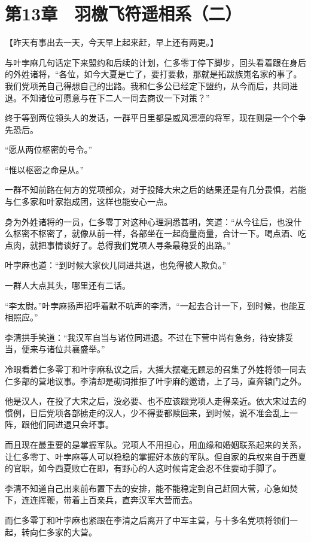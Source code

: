 \section{第13章　羽檄飞符遥相系（二）}

【昨天有事出去一天，今天早上起来赶，早上还有两更。】

与叶孛麻几句话定下来盟约和后续的计划，仁多零丁停下脚步，回头看着跟在身后的外姓诸将，“各位，如今大夏是亡了，要打要救，那就是拓跋族嵬名家的事了。我们党项羌自己得想自己的出路。我和仁多公已经定下盟约，从今而后，共同进退。不知诸位可愿意与在下二人一同去商议一下对策？”

终于等到两位领头人的发话，一群平日里都是威风凛凛的将军，现在则是一个个争先恐后。

“愿从两位枢密的号令。”

“惟以枢密之命是从。”

一群不知前路在何方的党项部众，对于投降大宋之后的结果还是有几分畏惧，若能与仁多家和叶家抱成团，这样也能安心一点。

身为外姓诸将的一员，仁多零丁对这种心理洞悉甚明，笑道：“从今往后，也没什么枢密不枢密了，就像从前一样，各部坐在一起商量商量，合计一下。喝点酒、吃点肉，就把事情谈好了。总得我们党项人寻条最稳妥的出路。”

叶孛麻也道：“到时候大家伙儿同进共退，也免得被人欺负。”

一群人大点其头，哪里还有二话。

“李太尉。”叶孛麻扬声招呼着默不吭声的李清，“一起去合计一下，到时候，也能互相照应。”

李清拱手笑道：“我汉军自当与诸位同进退。不过在下营中尚有急务，待安排妥当，便来与诸位共襄盛举。”

冷眼看着仁多零丁和叶孛麻私议之后，大摇大摆毫无顾忌的召集了外姓将领一同去仁多部的营地议事。李清却是砌词推拒了叶孛麻的邀请，上了马，直奔辕门之外。

他是汉人，在投了大宋之后，没必要、也不应该跟党项人走得亲近。依大宋过去的惯例，日后党项各部掳走的汉人，少不得要都赎回来，到时候，说不准会乱上一阵，跟他们同进退只会坏事。

而且现在最重要的是掌握军队。党项人不用担心，用血缘和婚姻联系起来的关系，让仁多零丁、叶孛麻等人可以稳稳的掌握好本族的军队。但自家的兵权来自于西夏的官职，如今西夏败亡在即，有野心的人这时候肯定会忍不住要动手脚了。

李清不知道自己出来前布置下去的安排，能不能稳定到自己赶回大营，心急如焚下，连连挥鞭，带着上百亲兵，直奔汉军大营而去。

而仁多零丁和叶孛麻也紧跟在李清之后离开了中军主营，与十多名党项将领们一起，转向仁多家的大营。

